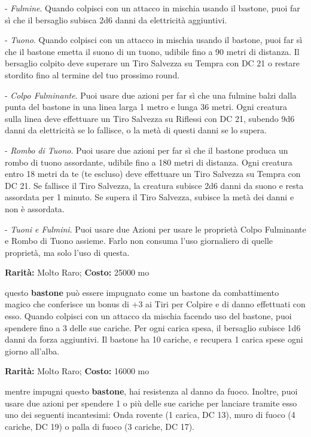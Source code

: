 \begin{multicols}{2}
- \emph{Fulmine}. Quando colpisci con un attacco in mischia usando il bastone, puoi far sì che il bersaglio subisca 2d6 danni da elettricità aggiuntivi.

- \emph{Tuono}. Quando colpisci con un attacco in mischia usando il bastone, puoi far sì che il bastone emetta il suono di un tuono, udibile fino a 90 metri di distanza. Il bersaglio colpito deve superare un Tiro Salvezza su Tempra con DC 21 o restare stordito fino al termine del tuo prossimo round.

- \emph{Colpo Fulminante}. Puoi usare due azioni per far sì che una fulmine balzi dalla punta del bastone in una linea larga 1 metro e lunga 36 metri. Ogni creatura sulla linea deve effettuare un Tiro Salvezza su Riflessi con DC 21, subendo 9d6 danni da elettricità se lo fallisce, o la metà di questi danni se lo supera.

- \emph{Rombo di Tuono}. Puoi usare due azioni per far sì che il bastone produca un rombo di tuono assordante, udibile fino a 180 metri di distanza. Ogni creatura entro 18 metri da te (te escluso) deve effettuare un Tiro Salvezza su Tempra con DC 21. Se fallisce il Tiro Salvezza, la creatura subisce 2d6 danni da suono e resta assordata per 1 minuto. Se supera il Tiro Salvezza, subisce la metà dei danni e non è assordata.

- \emph{Tuoni e Fulmini}. Puoi usare due Azioni per usare le proprietà Colpo Fulminante e Rombo di Tuono assieme. Farlo non consuma l'uso giornaliero di quelle proprietà, ma solo l'uso di questa.


\textbf{Rarità:} Molto Raro; \textbf{Costo:} 25000 mo

questo \textbf{bastone} può essere impugnato come un bastone da combattimento magico che conferisce un bonus di +3 ai Tiri per Colpire e di danno effettuati con esso. Quando colpisci con un attacco da mischia facendo uso del bastone, puoi spendere fino a 3 delle sue cariche. Per ogni carica spesa, il bersaglio subisce 1d6 danni da forza aggiuntivi. Il bastone ha 10 cariche, e recupera 1 carica spese ogni giorno all'alba.


\textbf{Rarità:} Molto Raro; \textbf{Costo:} 16000 mo

mentre impugni questo \textbf{bastone}, hai resistenza al danno da fuoco.
Inoltre, puoi usare due azioni per spendere 1 o più delle sue cariche per lanciare tramite esso uno dei seguenti incantesimi: Onda rovente (1 carica, DC 13), muro di fuoco (4 cariche, DC 19) o palla di fuoco (3 cariche, DC 17).


\end{multicols}
